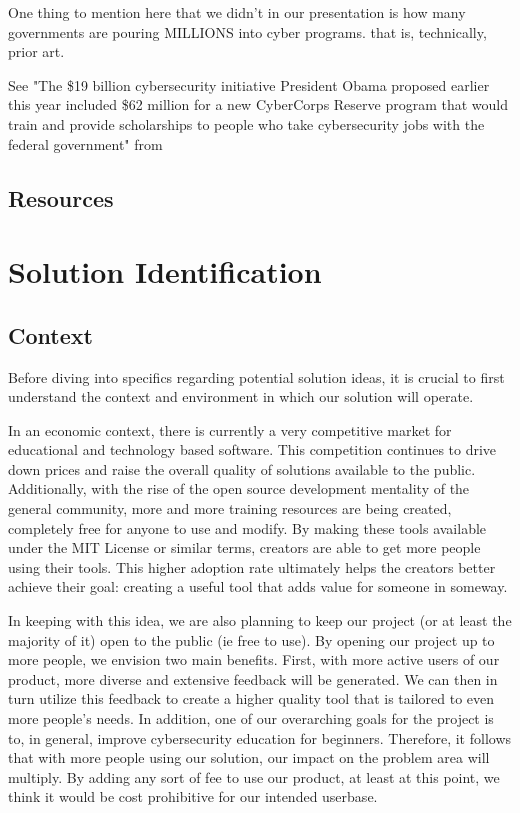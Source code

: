 \documentclass[openright]{report}
\begin{document}
\par One thing to mention here that we didn't in our presentation is how many governments are pouring MILLIONS into cyber programs. that is, technically, prior art.

\par See "The \$19 billion cybersecurity initiative President Obama proposed earlier this year included \$62 million for a new CyberCorps Reserve program that would train and provide scholarships to people who take cybersecurity jobs with the federal government" from \cite{why_no_cyber_classes}


\section{Resources}

\chapter{Solution Identification}

\section{Context}

\par Before diving into specifics regarding potential solution ideas, it is crucial to first understand the context and environment in which our solution will operate.

\par In an economic context, there is currently a very competitive market for educational and technology based software. This competition continues to drive down prices and raise the overall quality of solutions available to the public. Additionally, with the rise of the open source development mentality of the general community, more and more training resources are being created, completely free for anyone to use and modify. By making these tools available under the MIT License or similar terms, creators are able to get more people using their tools. This higher adoption rate ultimately helps the creators better achieve their goal: creating a useful tool that adds value for someone in someway.

\par In keeping with this idea, we are also planning to keep our project (or at least the majority of it) open to the public (ie free to use). By opening our project up to more people, we envision two main benefits. First, with more active users of our product, more diverse and extensive feedback will be generated. We can then in turn utilize this feedback to create a higher quality tool that is tailored to even more people's needs. In addition, one of our overarching goals for the project is to, in general, improve cybersecurity education for beginners. Therefore, it follows that with more people using our solution, our impact on the problem area will multiply. By adding any sort of fee to use our product, at least at this point, we think it would be cost prohibitive for our intended userbase.
\end{document}
